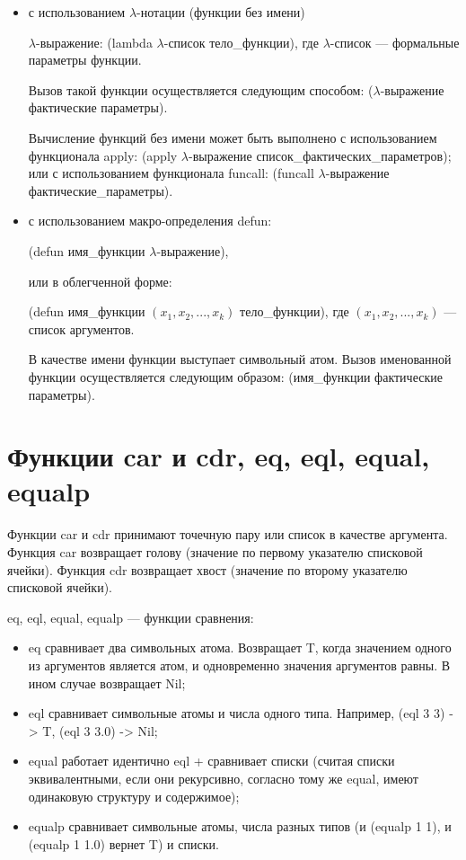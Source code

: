 \documentclass[12pt]{report}
\begin{document}
\begin{itemize}
    \item с использованием $\lambda$-нотации (функции без имени)
	
            $\lambda$-выражение: (lambda $\lambda$-список тело\_функции), 
            где $\lambda$-список --- формальные параметры функции.
	
            Вызов такой функции осуществляется следующим способом: ($\lambda$-выражение фактические параметры).

            Вычисление функций без имени может быть выполнено с использованием функционала apply: (apply $\lambda$-выражение список\_фактических\_параметров); или с использованием функционала funcall: (funcall $\lambda$-выражение фактические\_параметры).
	
    \item с использованием макро-определения defun: 
	
	(defun имя\_функции $\lambda$-выражение), 
	
	или  в облегченной форме:
	
	(defun имя\_функции $(x_1, x_2, ..., x_k)$ тело\_функции), 
	где $(x_1, x_2, ..., x_k)$ --- список аргументов.
	
	В качестве имени функции выступает символьный атом. 
	Вызов именованной функции осуществляется следующим образом: (имя\_функции фактические параметры).
\end{itemize} 


\section{Функции car и cdr, eq, eql, equal, equalp}

Функции car и cdr принимают точечную пару или список в качестве аргумента. Функция car возвращает голову (значение по первому указателю списковой ячейки). Функция cdr возвращает хвост (значение по второму указателю списковой ячейки).  

eq, eql, equal, equalp --- функции сравнения:

\begin{itemize}
	\item eq сравнивает два символьных атома. Возвращает T, когда значением одного из аргументов является атом, и одновременно значения аргументов равны. В ином случае возвращает Nil;
	\item eql сравнивает символьные атомы и числа одного типа. Например, (eql 3 3) -> T, (eql 3 3.0) -> Nil;
	\item equal работает идентично eql + сравнивает списки (считая списки эквивалентными, если они рекурсивно, согласно тому же equal, имеют одинаковую структуру и содержимое);
	\item equalp сравнивает символьные атомы, числа разных типов (и (equalp 1 1), и (equalp 1 1.0) вернет T) и списки. 
\end{itemize}
\end{document}
